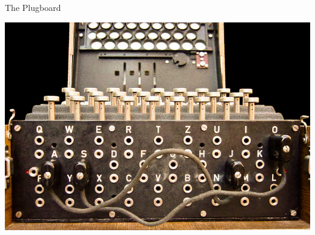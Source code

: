 \documentclass[hyphens,aspectratio=169]{beamer}
\begin{document}
\begin{frame}[fragile]{The Plugboard}
	\begin{center}
		\includegraphics[]{paper/images/plugboard.jpg}
	\end{center}
\end{frame}
\end{document}
